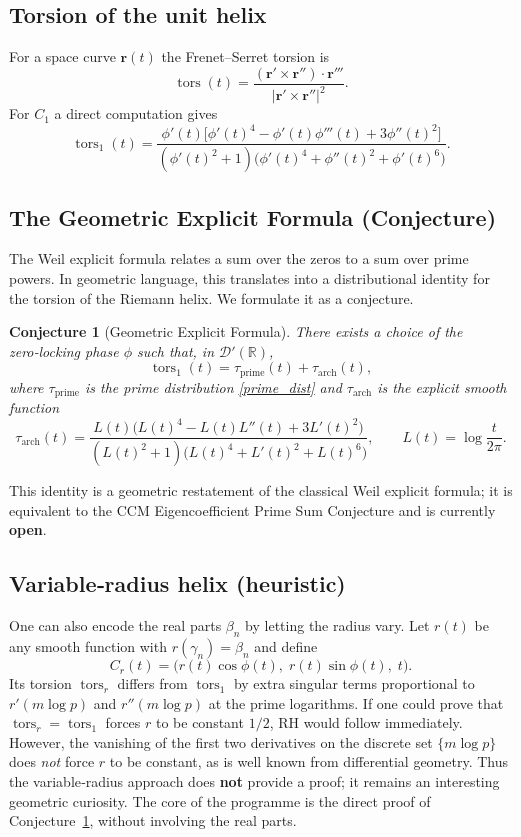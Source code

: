 \documentclass[11pt,a4paper]{article}
\newtheorem{conjecture}[theorem]{Conjecture}
\newcommand{\R}{\mathbb{R}}
\newcommand{\dist}{\mathcal{D}'}
\newcommand{\tors}{\operatorname{tors}}
\begin{document}
\subsection{Torsion of the unit helix}
For a space curve \(\mathbf{r}(t)\) the Frenet–Serret torsion is
\[
\tors(t) = \frac{(\mathbf{r}'\times\mathbf{r}'')\cdot\mathbf{r}'''}{|\mathbf{r}'\times\mathbf{r}''|^2}.
\]
For \(C_1\) a direct computation gives
\[
\tors_1(t) = \frac{\phi'(t)\bigl[ \phi'(t)^4 - \phi'(t)\phi'''(t) + 3\phi''(t)^2 \bigr]}
                  {(\phi'(t)^2+1)\bigl( \phi'(t)^4 + \phi''(t)^2 + \phi'(t)^6 \bigr)} . \tag{4}
\]

\subsection{The Geometric Explicit Formula (Conjecture)}
The Weil explicit formula relates a sum over the zeros to a sum over prime powers.  In geometric language, this translates into a distributional identity for the torsion of the Riemann helix.  We formulate it as a conjecture.

\begin{conjecture}[Geometric Explicit Formula]\label{conj:geom}
There exists a choice of the zero‑locking phase \(\phi\) such that, in \(\dist(\R)\),
\[
\tors_1(t) = \tau_{\text{prime}}(t) + \tau_{\text{arch}}(t),
\tag{5}
\]
where \(\tau_{\text{prime}}\) is the prime distribution \eqref{prime_dist} and \(\tau_{\text{arch}}\) is the explicit smooth function
\[
\tau_{\text{arch}}(t) = \frac{L(t)\bigl(L(t)^4 - L(t)L''(t) + 3L'(t)^2\bigr)}
                            {(L(t)^2+1)\bigl(L(t)^4 + L'(t)^2 + L(t)^6\bigr)},
\qquad L(t)=\log\frac{t}{2\pi}. \tag{6}
\]
\end{conjecture}

This identity is a geometric restatement of the classical Weil explicit formula; it is equivalent to the CCM Eigencoefficient Prime Sum Conjecture \cite{CCM} and is currently \textbf{open}.

\subsection{Variable‑radius helix (heuristic)}
One can also encode the real parts \(\beta_n\) by letting the radius vary.  Let \(r(t)\) be any smooth function with \(r(\gamma_n)=\beta_n\) and define
\[
C_r(t) = \bigl( r(t)\cos\phi(t),\; r(t)\sin\phi(t),\; t \bigr).
\]
Its torsion \(\tors_r\) differs from \(\tors_1\) by extra singular terms proportional to \(r'(m\log p)\) and \(r''(m\log p)\) at the prime logarithms.  If one could prove that \(\tors_r = \tors_1\) forces \(r\) to be constant \(1/2\), RH would follow immediately.  However, the vanishing of the first two derivatives on the discrete set \(\{m\log p\}\) does \emph{not} force \(r\) to be constant, as is well known from differential geometry.  Thus the variable‑radius approach does \textbf{not} provide a proof; it remains an interesting geometric curiosity.  The core of the programme is the direct proof of Conjecture~\ref{conj:geom}, without involving the real parts.
\end{document}
